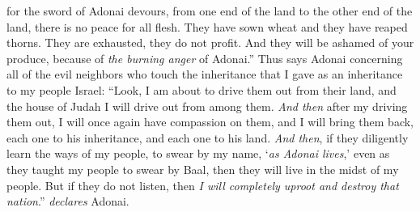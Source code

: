 \begin{biblechapter}
for the sword of Adonai devours, 
from one end of the land to the other end of the land, 
there is no peace for all flesh.
\verse They have sown wheat and they have reaped thorns. 
They are exhausted, they do not profit. 
And they will be ashamed of your produce, 
because of \textit{the burning anger} of Adonai.”
\verse Thus says Adonai concerning all of the evil neighbors who touch the inheritance that I gave as an inheritance to my people Israel: “Look, I am about to drive them out from their land, and the house of Judah I will drive out from among them.
\verse \textit{And then} after my driving them out, I will once again have compassion on them, and I will bring them back, each one to his inheritance, and each one to his land.
\verse \textit{And then}, if they diligently learn the ways of my people, to swear by my name, ‘\textit{as Adonai lives},’ even as they taught my people to swear by Baal, then they will live in the midst of my people.
\verse But if they do not listen, then \textit{I will completely uproot and destroy that nation}.” \textit{declares} Adonai.
\end{biblechapter}

